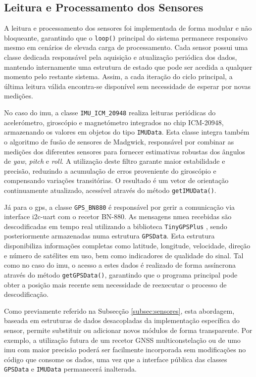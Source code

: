 \subsection{Leitura e Processamento dos Sensores}
\label{subsec:processamento-sensores}

A leitura e processamento dos sensores foi implementada de forma modular e não bloqueante, garantindo que o \texttt{loop()} principal do sistema permanece responsivo mesmo em cenários de elevada carga de processamento. Cada sensor possui uma classe dedicada responsável pela aquisição e atualização periódica dos dados, mantendo internamente uma estrutura de estado que pode ser acedida a qualquer momento pelo restante sistema. Assim, a cada iteração do ciclo principal, a última leitura válida encontra-se disponível sem necessidade de esperar por novas medições.

No caso do \gls{imu}, a classe \texttt{IMU\_ICM\_20948} realiza leituras periódicas do acelerómetro, giroscópio e magnetómetro integrados no chip ICM-20948, armazenando os valores em objetos do tipo \texttt{IMUData}. Esta classe integra também o algoritmo de fusão de sensores de Madgwick, responsável por combinar as medições dos diferentes sensores para fornecer estimativas robustas dos ângulos de \emph{yaw}, \emph{pitch} e \emph{roll}. A utilização deste filtro garante maior estabilidade e precisão, reduzindo a acumulação de erros proveniente do giroscópio e compensando variações transitórias. O resultado é um vetor de orientação continuamente atualizado, acessível através do método \texttt{getIMUData()}.

Já para o \gls{gps}, a classe \texttt{GPS\_BN880} é responsável por gerir a comunicação via interface \gls{i2c}-\gls{uart} com o recetor BN-880. As mensagens \gls{nmea} recebidas são descodificadas em tempo real utilizando a biblioteca \texttt{TinyGPSPlus} \cite{tinygpsplus}, sendo posteriormente armazenadas numa estrutura \texttt{GPSData}. Esta estrutura disponibiliza informações completas como latitude, longitude, velocidade, direção e número de satélites em uso, bem como indicadores de qualidade do sinal. Tal como no caso do \gls{imu}, o acesso a estes dados é realizado de forma assíncrona através do método \texttt{getGPSData()}, garantindo que o programa principal pode obter a posição mais recente sem necessidade de reexecutar o processo de descodificação. 

Como previamente referido na Subsecção \ref{subsec:sensores}, esta abordagem, baseada em estruturas de dados desacopladas da implementação específica do sensor, permite substituir ou adicionar novos módulos de forma transparente. Por exemplo, a utilização futura de um recetor GNSS multiconstelação ou de umo \gls{imu} com maior precisão poderá ser facilmente incorporada sem modificações no código que consome os dados, uma vez que a interface pública das classes \texttt{GPSData} e \texttt{IMUData} permanecerá inalterada.

